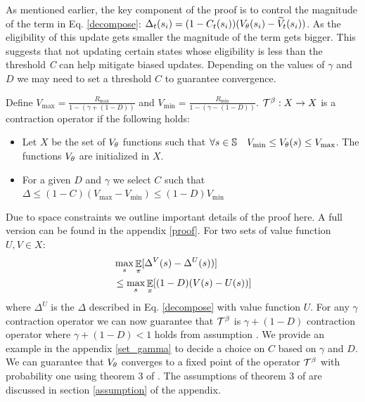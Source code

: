As mentioned earlier, the key component of the proof is to control the magnitude of the term in Eq. \ref{decompose}: 
$\Delta_t(s_i) = (1-C_t(s_i))(V_{\theta}(s_i) - \widetilde{V}_t(s_i))$. As the eligibility of this update gets smaller the magnitude of the term gets bigger. This suggests that not updating certain states whose eligibility is less than the threshold \emph{C} can help mitigate biased updates.
Depending on the values of $\gamma$ and $D$ we may need to set a threshold $C$ to guarantee convergence.
\begin{theorem}
\label{contraction_theorem}
Define $V_{\max} = \frac{R_{\max}}{1-(\gamma+(1-D))}$ and $V_{\min} = \frac{R_{\min}}{1-(\gamma-(1-D))}$. $\mathcal{T}^{\beta}: X \rightarrow X$ is a contraction operator if the following holds:
\begin{itemize}
    \item Let $X$ be the set of $V_{\theta}$ functions such that $\forall s \in \mathbb{S} \quad  V_{\min} \leq V_{\theta}(s) \leq V_{\max}$.  The functions $V_{\theta}$ are initialized in $X$.
    \item For a given $D$ and $\gamma$ we select $C$ such that $\Delta \leq (1-C)(V_{\max}-V_{\min}) \leq (1-D)V_{\min}$
\end{itemize}
\end{theorem}
Due to space constraints we outline important details of the proof here. A full version can be found in the appendix \ref{proof}. For two sets of value function $U,V \in X$:
\begin{equation}
\begin{split}
    &\max_{s}\mathop{\mathbb{E}}_{\pi}[ \Delta^V(s) -  \Delta^U(s))] \\
    &\leq \max_{s}\mathop{\mathbb{E}}_{\pi}[(1-D)(V(s)-U(s))]\\
\end{split}
\end{equation}
where $\Delta^U$ is the $\Delta$ described in Eq. \ref{decompose} with value function $U$. For any $\gamma$ contraction operator we can now guarantee that $\mathcal{T}^{\beta}$ is $\gamma + (1-D)$ contraction operator where $\gamma + (1-D) < 1$ holds from assumption \label{a_rew}. We provide an example in the appendix \ref{set_gamma} to decide a choice on $C$ based on $\gamma$ and $D$.
We can guarantee that $V_{\theta}$ converges to a fixed point of the operator $\mathcal{T}^{\beta}$ with probability one using theorem 3 of \cite{tsitsiklis1994asynchronous}. The assumptions of theorem 3 of \cite{tsitsiklis1994asynchronous} are discussed in section \ref{assumption} of the appendix.

